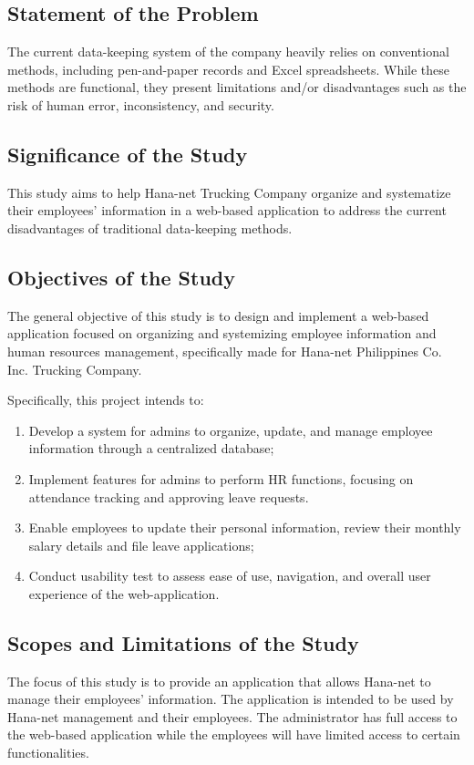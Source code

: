 \documentclass{icsthesis}
\begin{document}
\begin{mainmatter}
\subsection{\textbf{Statement of the Problem}}
The current data-keeping system of the company heavily relies on conventional methods, including pen-and-paper records and Excel spreadsheets. While these methods are functional, they present limitations and/or disadvantages such as the risk of human error, inconsistency, and security.


\subsection{\textbf{Significance of the Study}}
This study aims to help Hana-net Trucking Company organize and systematize their employees' information in a web-based application to address the current disadvantages of traditional data-keeping methods. 


\subsection{\textbf{Objectives of the Study}}
The general objective of this study is to design and implement a web-based application focused on organizing and systemizing employee information and human resources management, specifically made for Hana-net Philippines Co. Inc. Trucking Company.

Specifically, this project intends to:
\begin{enumerate}
    \item Develop a system for admins to organize, update, and manage employee information through a centralized database;
    \item Implement features for admins to perform HR functions, focusing on attendance tracking and approving leave requests.
    \item Enable employees to update their personal information, review their monthly salary details and file leave applications;
    \item Conduct usability test to assess ease of use, navigation, and overall user experience of the web-application.
\end{enumerate}


\subsection{\textbf{Scopes and Limitations of the Study}}
The focus of this study is to provide an application that allows Hana-net to manage their employees’ information. The application is intended to be used by Hana-net management and their employees. The administrator has full access to the web-based application while the employees will have limited access to certain functionalities. 


\end{mainmatter}
\end{document}
